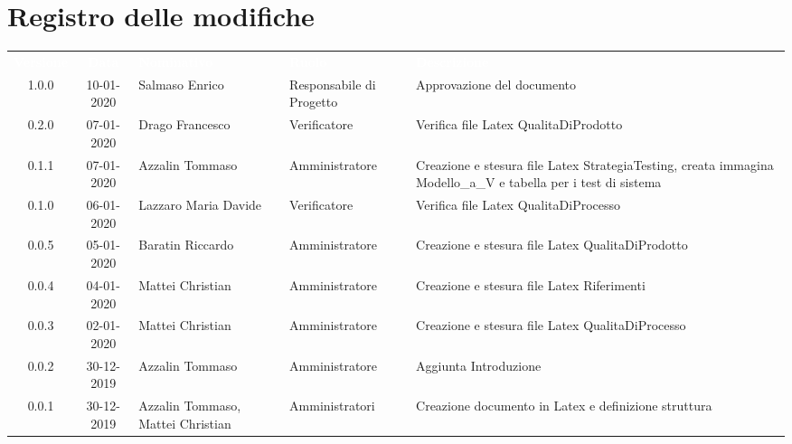 \section*{Registro delle modifiche}
{
\renewcommand{\arraystretch}{1.5}
\centering
\begin{longtable}{ c c  C{4cm}  C{3cm} C{4cm}}
\textcolor{white}{\textbf{Versione}} & \textcolor{white}{\textbf{Data}} & \textcolor{white}{\textbf{Nominativo}} & \textcolor{white}{\textbf{Ruolo}} & \textcolor{white}{\textbf{Descrizione}}\\	

1.0.0 & 10-01-2020 & Salmaso Enrico & Responsabile di Progetto & Approvazione del documento \\	

0.2.0 & 07-01-2020 & Drago Francesco & Verificatore & Verifica file Latex QualitaDiProdotto \\
0.1.1 & 07-01-2020 & Azzalin Tommaso & Amministratore & Creazione e stesura file Latex StrategiaTesting, creata immagina Modello\_a\_V e tabella per i test di sistema \\
0.1.0 & 06-01-2020 & Lazzaro Maria Davide & Verificatore & Verifica file Latex QualitaDiProcesso \\
0.0.5 & 05-01-2020 & Baratin Riccardo & Amministratore & Creazione e stesura file Latex QualitaDiProdotto \\
0.0.4 & 04-01-2020 & Mattei Christian & Amministratore & Creazione e stesura file Latex Riferimenti \\
0.0.3 & 02-01-2020 & Mattei Christian & Amministratore & Creazione e stesura file Latex QualitaDiProcesso \\
0.0.2 & 30-12-2019 & Azzalin Tommaso & Amministratore & Aggiunta Introduzione \\
0.0.1 & 30-12-2019 & Azzalin Tommaso, Mattei Christian & Amministratori & Creazione documento in Latex e definizione struttura \\	
		
\end{longtable}
}
